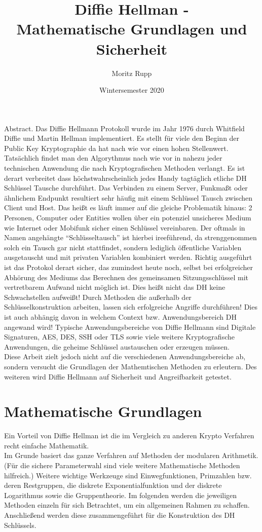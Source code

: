 \documentclass[a4paper,12pt]{scrartcl}
\title{Diffie Hellman -\\Mathematische Grundlagen und Sicherheit}
\author{Moritz Rupp}
\date{Wintersemester 2020}
\begin{document}
\maketitle
\newpage
\tableofcontents
\newpage


Abstract. \newline
Das Diffie Hellmann Protokoll wurde im Jahr 1976 durch Whitfield Diffie und Martin Hellman implementiert. Es stellt für viele den Beginn der Public Key Kryptographie da hat nach wie vor einen hohen Stellenwert. 
Tatsächlich findet man den Algorythmus nach wie vor in nahezu jeder technischen Anwendung die nach Kryptografischen Methoden verlangt. 
Es ist derart verbreitet dass höchstwahrscheinlich jedes Handy tagtäglich etliche DH Schlüssel Tausche durchführt.
Das Verbinden zu einem Server, Funkmaßt oder ähnlichem Endpunkt resultiert sehr häufig mit einem Schlüssel Tausch zwischen Client und Host. 
Das heißt es läuft immer auf die gleiche Problematik hinaus:
2 Personen, Computer oder Entities wollen über ein potenziel unsicheres Medium wie Internet oder Mobifunk sicher einen Schlüssel vereinbaren. 
Der oftmals in Namen angehängte “Schlüsseltausch” ist hierbei ireeführend, da strenggenommen solch ein Tausch gar nicht stattfindet, sondern lediglich öffentliche Variablen ausgetauscht und mit privaten Variablen kombiniert werden. 
Richtig ausgeführt ist das Protokol derart sicher, das zumindest heute noch, selbst bei erfolgreicher Abhörung des Mediums das Berechnen des gemeinsamen Sitzungsschlüssel mit vertretbarem Aufwand nicht möglich ist.
Dies heißt nicht das DH keine Schwachstellen aufweißt! Durch Methoden die außerhalb der Schlüsselkonstruktion arbeiten, lassen sich erfolgreiche Angriffe durchführen! Dies ist auch abhängig davon in welchem Context bzw. Anwendungsbereich DH angewand wird!
Typische Anwendungsbereiche von Diffie Hellmann sind Digitale Signaturen, AES, DES, SSH oder TLS sowie viele weitere Kryptografische Anwendungen, die geheime Schlüssel austauschen oder erzeugen müssen.\\
Diese Arbeit zielt jedoch nicht auf die verschiedenen Anwendungsbereiche ab, sondern versucht die Grundlagen der Mathemtischen Methoden zu erleutern. Des weiteren wird Diffie Hellmann auf Sicherheit und Angreifbarkeit getestet.

\newpage

\section{Mathematische Grundlagen}
Ein Vorteil von Diffie Hellman ist die im Vergleich zu anderen Krypto Verfahren recht einfache Mathematik. \\
Im Grunde basiert das ganze Verfahren auf Methoden der modularen Arithmetik. \\
(Für die sichere Parameterwahl sind viele weitere Mathematische Methoden hilfreich.)
Weitere wichtige Werkzeuge sind Einwegfunktionen, Primzahlen bzw. deren Restgruppen, die diskrete Exponentialfunktion und der diskrete Logarithmus sowie die Gruppentheorie. Im folgenden werden  die jeweiligen Methoden einzeln für sich Betrachtet, um ein allgemeinen Rahmen zu schaffen. Anschließend werden diese zusammengeführt für die Konstruktion des DH Schlüssels.
\end{document}
